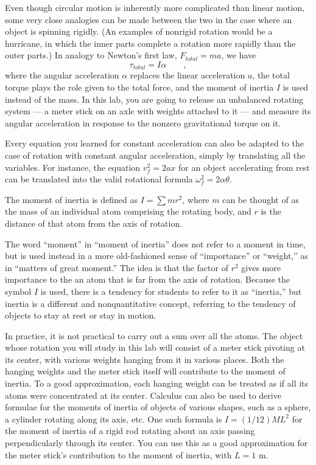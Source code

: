 Even though circular motion is inherently more complicated
than linear motion, some very close analogies can be made
between the two in the case where an object is spinning
rigidly.  (An examples of nonrigid rotation would be a
hurricane, in which the inner parts complete a rotation more
rapidly than the outer parts.)  In analogy to Newton's first
law, $F_{total}=ma$, we have
\begin{equation*}
	\tau_{total}=I\alpha    \qquad   ,
\end{equation*}
where the angular acceleration $\alpha $ replaces the linear
acceleration $a$, the total torque plays the role given to
the total force, and the moment of inertia $I$ is used
instead of the mass. In this lab, you are going to release
an unbalanced rotating system --- a meter stick on an axle
with weights attached to it --- and measure its angular
acceleration in response to the nonzero gravitational torque on it.

   Every equation you learned for constant acceleration can
also be adapted to the case of rotation with constant
angular acceleration, simply by translating all the
variables.  For instance, the equation $v_f^2=2ax$
for an object accelerating from rest can be translated into
the valid rotational formula $\omega_f^2=2\alpha\theta$.

The moment of inertia is defined as $I=\sum mr^2$,  where
$m$ can be thought of as the mass of an individual atom
comprising the rotating body, and $r$ is the distance of
that atom from the axis of rotation.

The word ``moment'' in ``moment of inertia'' does not refer
to a moment in time, but is used instead in a more
old-fashioned sense of ``importance'' or ``weight,'' as in
``matters of great moment.''  The idea is that the factor of
$r^2$ gives more importance to the an atom that is far from
the axis of rotation.  Because the symbol $I$ is used, there
is a tendency for students to refer to it as ``inertia,''
but inertia is a different and nonquantitative concept,
referring to the tendency of objects to stay at rest or stay in motion.

In practice, it is not practical to carry out a sum over all
the atoms.  The object whose rotation you will study in this
lab will consist of a meter stick pivoting at its center,
with various weights hanging from it in various places. 
Both the hanging weights and the meter stick itself will
contribute to the moment of inertia.  To a good approximation,
each hanging weight can be treated as if all its atoms were
concentrated at its center.  Calculus can also be used to
derive formulae for the moments of inertia of objects of
various shapes, such as a sphere, a cylinder rotating along
its axis, etc.  One such formula is $I=(1/12)ML^2$ for the moment of
inertia of a rigid rod rotating about an axis passing
perpendicularly through its center.  You can use this
as a good approximation for the meter stick's
contribution to the moment of inertia, with $L=1$ m.

